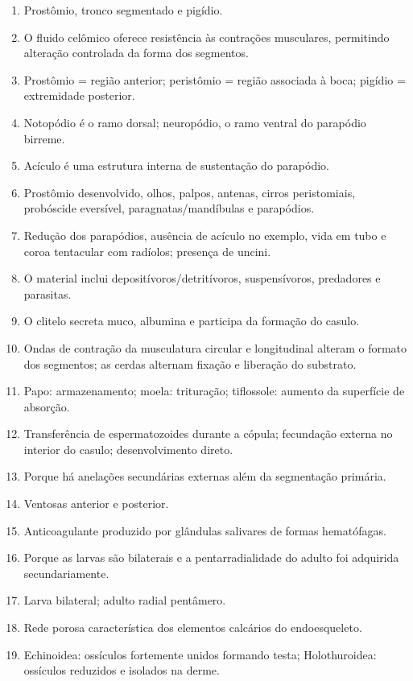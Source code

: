 \documentclass[a4paper,12pt]{article}
\begin{document}
\begin{enumerate}
  \item Prostômio, tronco segmentado e pigídio.
  \item O fluido celômico oferece resistência às contrações musculares, permitindo alteração controlada da forma dos segmentos.
  \item Prostômio = região anterior; peristômio = região associada à boca; pigídio = extremidade posterior.
  \item Notopódio é o ramo dorsal; neuropódio, o ramo ventral do parapódio birreme.
  \item Acículo é uma estrutura interna de sustentação do parapódio.
  \item Prostômio desenvolvido, olhos, palpos, antenas, cirros peristomiais, probóscide eversível, paragnatas/mandíbulas e parapódios.
  \item Redução dos parapódios, ausência de acículo no exemplo, vida em tubo e coroa tentacular com radíolos; presença de uncini.
  \item O material inclui depositívoros/detritívoros, suspensívoros, predadores e parasitas.
  \item O clitelo secreta muco, albumina e participa da formação do casulo.
  \item Ondas de contração da musculatura circular e longitudinal alteram o formato dos segmentos; as cerdas alternam fixação e liberação do substrato.
  \item Papo: armazenamento; moela: trituração; tiflossole: aumento da superfície de absorção.
  \item Transferência de espermatozoides durante a cópula; fecundação externa no interior do casulo; desenvolvimento direto.
  \item Porque há anelações secundárias externas além da segmentação primária.
  \item Ventosas anterior e posterior.
  \item Anticoagulante produzido por glândulas salivares de formas hematófagas.
  \item Porque as larvas são bilaterais e a pentarradialidade do adulto foi adquirida secundariamente.
  \item Larva bilateral; adulto radial pentâmero.
  \item Rede porosa característica dos elementos calcários do endoesqueleto.
  \item Echinoidea: ossículos fortemente unidos formando testa; Holothuroidea: ossículos reduzidos e isolados na derme.

\end{enumerate}
\end{document}
